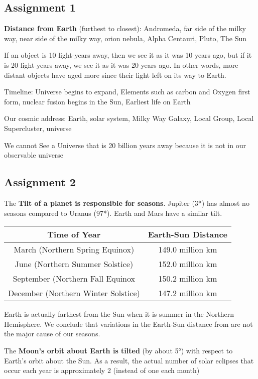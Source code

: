 \subsection{Assignment 1}
{\bf Distance from Earth} (furthest to closest): Andromeda, far side of the milky way, near side of the milky way, orion nebula, Alpha Centauri, Pluto, The Sun

If an object is 10 light-years away, then we see it as it was 10 years ago, but if it is 20 light-years away, we see it as it was 20 years ago. In other words, more distant objects have aged more since their light left on its way to Earth.

Timeline: Universe begins to expand, Elements such as carbon and Oxygen first form, nuclear fusion begins in the Sun, Earliest life on Earth

Our cosmic address: Earth, solar system, Milky Way Galaxy, Local Group, Local Supercluster, universe

We cannot See a Universe that is 20 billion years away because it is not in our observable universe

\subsection{Assignment 2}
The {\bf Tilt of a planet is responsible for seasons}. Jupiter (3*) has almost no seasons compared to Uranus (97*). Earth and Mars have a similar tilt.

\begin{tabular}{|c|c|}
\hline
Time of Year & Earth-Sun Distance \\ \hline
March (Northern Spring Equinox) & 149.0 million km\\
June (Northern Summer Solstice) & 152.0 million km\\
September (Northern Fall Equinox & 150.2 million km\\
December (Northern Winter Solstice) & 147.2 million km\\ \hline
\end{tabular}

Earth is actually farthest from the Sun when it is summer in the Northern Hemisphere. We conclude that variations in the Earth-Sun distance from are not the major cause of our seasons.

The {\bf Moon’s orbit about Earth is tilted} (by about 5°) with respect to Earth’s orbit about the Sun. As a result, the actual number of solar eclipses that occur each year is approximately 2 (instead of one each month)

